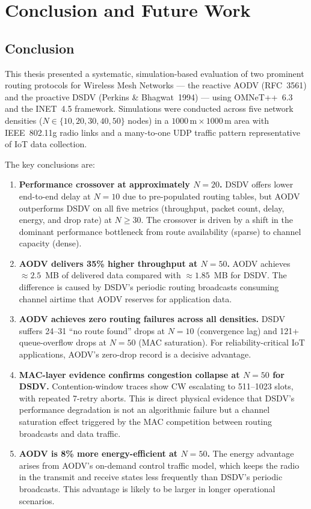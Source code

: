 \chapter{Conclusion and Future Work}
\label{ch:conclusion}

\section{Conclusion}

This thesis presented a systematic, simulation-based evaluation of two prominent routing
protocols for Wireless Mesh Networks --- the reactive AODV (RFC~3561) and the proactive
DSDV (Perkins \& Bhagwat~1994) --- using OMNeT++~6.3 and the INET~4.5 framework.
Simulations were conducted across five network densities ($N \in \{10, 20, 30, 40, 50\}$
nodes) in a $1000\,\text{m} \times 1000\,\text{m}$ area with IEEE~802.11g radio links
and a many-to-one UDP traffic pattern representative of IoT data collection.

The key conclusions are:

\begin{enumerate}
  \item \textbf{Performance crossover at approximately $N = 20$.} DSDV offers lower
    end-to-end delay at $N = 10$ due to pre-populated routing tables, but AODV
    outperforms DSDV on all five metrics (throughput, packet count, delay, energy, and
    drop rate) at $N \geq 30$. The crossover is driven by a shift in the dominant
    performance bottleneck from route availability (sparse) to channel capacity (dense).

  \item \textbf{AODV delivers 35\% higher throughput at $N = 50$.} AODV achieves
    $\approx 2.5$~MB of delivered data compared with $\approx 1.85$~MB for DSDV. The
    difference is caused by DSDV's periodic routing broadcasts consuming channel airtime
    that AODV reserves for application data.

  \item \textbf{AODV achieves zero routing failures across all densities.} DSDV suffers
    24--31 ``no route found'' drops at $N = 10$ (convergence lag) and 121+ queue-overflow
    drops at $N = 50$ (MAC saturation). For reliability-critical IoT applications,
    AODV's zero-drop record is a decisive advantage.

  \item \textbf{MAC-layer evidence confirms congestion collapse at $N = 50$ for DSDV.}
    Contention-window traces show CW escalating to 511--1023 slots, with repeated
    7-retry aborts. This is direct physical evidence that DSDV's performance degradation
    is not an algorithmic failure but a channel saturation effect triggered by the MAC
    competition between routing broadcasts and data traffic.

  \item \textbf{AODV is 8\% more energy-efficient at $N = 50$.} The energy advantage
    arises from AODV's on-demand control traffic model, which keeps the radio in the
    transmit and receive states less frequently than DSDV's periodic broadcasts. This
    advantage is likely to be larger in longer operational scenarios.
\end{enumerate}

